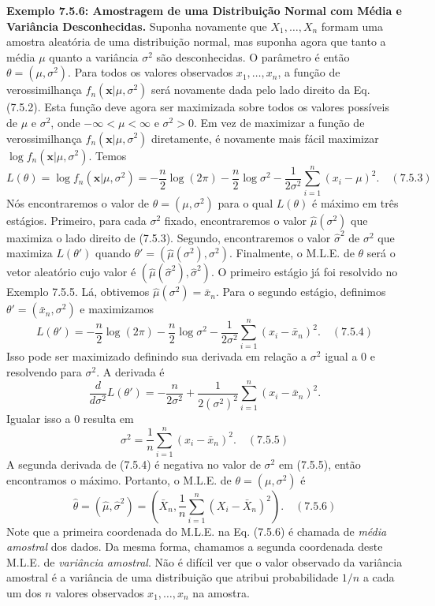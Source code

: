 \textbf{Exemplo 7.5.6: Amostragem de uma Distribuição Normal com Média e Variância Desconhecidas.} Suponha novamente que $X_1, \dots, X_n$ formam uma amostra aleatória de uma distribuição normal, mas suponha agora que tanto a média $\mu$ quanto a variância $\sigma^2$ são desconhecidas. O parâmetro é então $\theta = (\mu, \sigma^2)$. Para todos os valores observados $x_1, \dots, x_n$, a função de verossimilhança $f_n(\textbf{x}|\mu, \sigma^2)$ será novamente dada pelo lado direito da Eq. (7.5.2). Esta função deve agora ser maximizada sobre todos os valores possíveis de $\mu$ e $\sigma^2$, onde $-\infty < \mu < \infty$ e $\sigma^2 > 0$. Em vez de maximizar a função de verossimilhança $f_n(\textbf{x}|\mu, \sigma^2)$ diretamente, é novamente mais fácil maximizar $\log f_n(\textbf{x}|\mu, \sigma^2)$. Temos
$$L(\theta) = \log f_n(\textbf{x}|\mu, \sigma^2) = -\frac{n}{2} \log(2\pi) - \frac{n}{2} \log \sigma^2 - \frac{1}{2\sigma^2} \sum_{i=1}^{n} (x_i - \mu)^2. \quad (7.5.3)$$
Nós encontraremos o valor de $\theta = (\mu, \sigma^2)$ para o qual $L(\theta)$ é máximo em três estágios. Primeiro, para cada $\sigma^2$ fixado, encontraremos o valor $\hat{\mu}(\sigma^2)$ que maximiza o lado direito de (7.5.3). Segundo, encontraremos o valor $\hat{\sigma}^2$ de $\sigma^2$ que maximiza $L(\theta')$ quando $\theta' = (\hat{\mu}(\sigma^2), \sigma^2)$. Finalmente, o M.L.E. de $\theta$ será o vetor aleatório cujo valor é $(\hat{\mu}(\hat{\sigma}^2), \hat{\sigma}^2)$. O primeiro estágio já foi resolvido no Exemplo 7.5.5. Lá, obtivemos $\hat{\mu}(\sigma^2) = \bar{x}_n$. Para o segundo estágio, definimos $\theta' = (\bar{x}_n, \sigma^2)$ e maximizamos
$$L(\theta') = -\frac{n}{2} \log(2\pi) - \frac{n}{2} \log \sigma^2 - \frac{1}{2\sigma^2} \sum_{i=1}^{n} (x_i - \bar{x}_n)^2. \quad (7.5.4)$$
Isso pode ser maximizado definindo sua derivada em relação a $\sigma^2$ igual a 0 e resolvendo para $\sigma^2$. A derivada é
$$\frac{d}{d\sigma^2} L(\theta') = -\frac{n}{2\sigma^2} + \frac{1}{2(\sigma^2)^2} \sum_{i=1}^{n} (x_i - \bar{x}_n)^2.$$
Igualar isso a 0 resulta em
$$\sigma^2 = \frac{1}{n} \sum_{i=1}^{n} (x_i - \bar{x}_n)^2. \quad (7.5.5)$$
A segunda derivada de (7.5.4) é negativa no valor de $\sigma^2$ em (7.5.5), então encontramos o máximo. Portanto, o M.L.E. de $\theta = (\mu, \sigma^2)$ é
$$\hat{\theta} = (\hat{\mu}, \hat{\sigma}^2) = \left( \bar{X}_n, \frac{1}{n} \sum_{i=1}^{n} (X_i - \bar{X}_n)^2 \right). \quad (7.5.6)$$
Note que a primeira coordenada do M.L.E. na Eq. (7.5.6) é chamada de \textit{média amostral} dos dados. Da mesma forma, chamamos a segunda coordenada deste M.L.E. de \textit{variância amostral}. Não é difícil ver que o valor observado da variância amostral é a variância de uma distribuição que atribui probabilidade $1/n$ a cada um dos $n$ valores observados $x_1, \dots, x_n$ na amostra.

